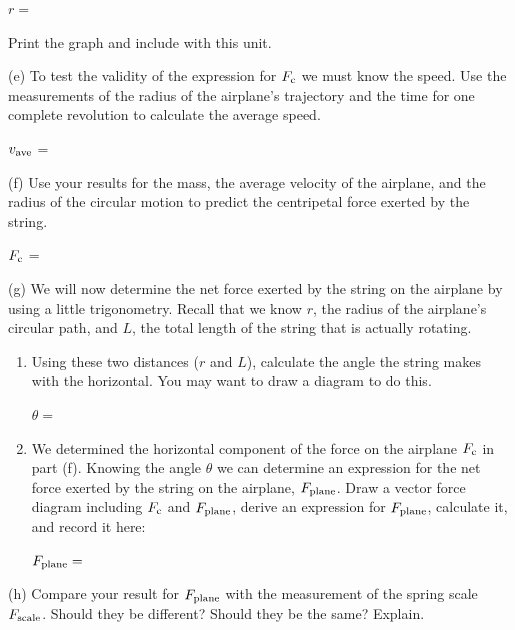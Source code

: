\hspace{0.5in} $r =$
\vspace{5mm}

Print the graph and include with this unit.

(e) To test the validity of the expression for \( F_{\rm c} \) we must know the
speed. Use the measurements of the radius of the airplane's trajectory and the
time for one complete revolution to calculate the average speed.
\vspace{5mm}

\hspace{0.5in} \( v_{\rm ave} \) = 
\vspace{5mm}

(f) Use your results for the mass, the average velocity of the airplane, and
the radius of the circular motion to predict the centripetal force exerted by
the string.
\vspace{5mm}

\hspace{0.5in} \( F_{\rm c} \) = 
\vspace{5mm}

(g) We will now determine the net force exerted by the string on the airplane
by using a little trigonometry.
Recall that we know $r$, the radius of the airplane's circular path, and 
$L$, the total length of the string that is actually rotating. 

\begin{enumerate}
\item Using these two distances ($r$ and $L$), 
calculate the angle the string makes with
the horizontal. You may want to draw a diagram to do this. 

\bigskip
\( \theta  =\)  \vspace{5mm}

\item We determined the horizontal component of the force on the airplane 
\( F_{\rm c} \) in part (f). Knowing the angle \( \theta \) we can determine an
expression for the
net force exerted by the string on the airplane, \( F_{\rm plane} \). Draw a vector
force diagram including \( F_{\rm c} \) and \( F_{\rm plane} \), derive an expression
for \( F_{\rm plane} \), calculate it, and record it here: 

\bigskip
\( F_{\rm plane} =\)  \vspace{10mm}

\end{enumerate}
(h) Compare your result for \( F_{\rm plane} \) with the measurement of the spring
scale \( F_{\rm scale} \). Should they be different? Should they be the same? Explain.
\vspace{15mm}


